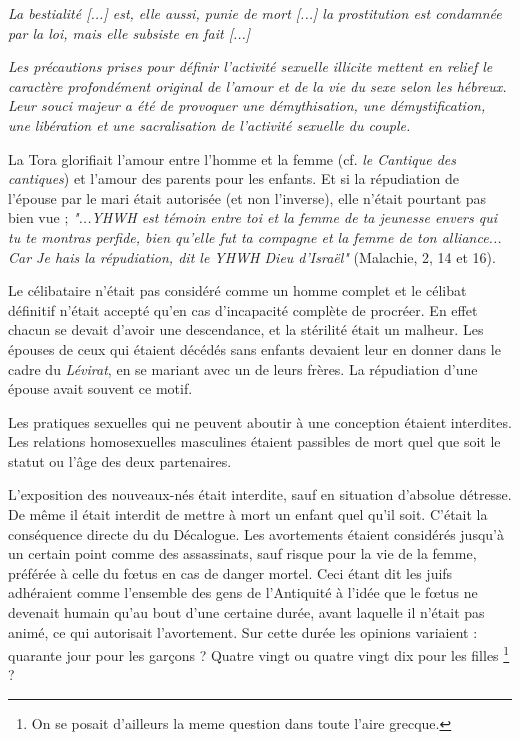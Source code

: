 \begin{displayquote}
{ \emph{La bestialité \emph{[...]} est, elle aussi, punie de mort \emph{[...]} la prostitution est condamnée par la loi, mais elle subsiste en fait \emph{[...]}}

 \emph{Les précautions prises pour définir l'activité sexuelle illicite mettent en relief le caractère profondément original de l'amour et de la vie du sexe selon les hébreux. Leur souci majeur a été de provoquer une démythisation, une démystification, une libération et une sacralisation de l'activité sexuelle du couple.}
}%
\end{displayquote}

 La Tora glorifiait l'amour entre l'homme et la femme (cf. \emph{le Cantique des cantiques}) et l'amour des parents pour les enfants. Et si la répudiation de l'épouse par le mari était autorisée (et non l'inverse), elle n'était pourtant pas bien vue ; \emph{"...YHWH est témoin entre toi et la femme de ta jeunesse envers qui tu te montras perfide, bien qu'elle fut ta compagne et la femme de ton alliance... Car Je hais la répudiation, dit le YHWH Dieu d'Israël"} (Malachie, 2, 14 et 16). 
 
 Le célibataire n'était pas considéré comme un homme complet et le célibat définitif n'était accepté qu'en cas d'incapacité complète de procréer. En effet chacun se devait d'avoir une descendance, et la stérilité était un malheur. Les épouses de ceux qui étaient décédés sans enfants devaient leur en donner dans le cadre du \emph{Lévirat}, en se mariant avec un de leurs frères. La répudiation d'une épouse avait souvent ce motif. 

 Les pratiques sexuelles qui ne peuvent aboutir à une conception étaient interdites. Les relations homosexuelles masculines étaient passibles de mort quel que soit le statut ou l'âge des deux partenaires. 

 L'exposition des nouveaux-nés était interdite, sauf en situation d'absolue détresse. De même il était interdit de mettre à mort un enfant quel qu'il soit. C'était la conséquence directe du  du Décalogue. Les avortements étaient considérés jusqu'à un certain point comme des assassinats, sauf risque pour la vie de la femme, préférée à celle du fœtus en cas de danger mortel. Ceci étant dit les juifs adhéraient comme l'ensemble des gens de l'Antiquité à l'idée que le fœtus ne devenait humain qu'au bout d'une certaine durée, avant laquelle il n'était pas animé, ce qui autorisait l'avortement. Sur cette durée les opinions variaient : quarante jour pour les garçons ? Quatre vingt ou quatre vingt dix pour les filles \footnote{On se posait d'ailleurs la meme question dans toute l'aire grecque.} ?

